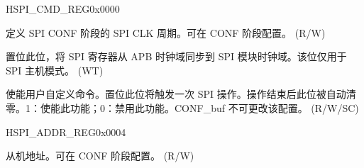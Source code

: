 \begin{register}{H}{SPI\_CMD\_REG}{0x0000}\label{regdesc:SPICMDREG}
%
%
%
%
%
\regnewline%
\begin{regdesc}\begin{reglist}
\label{fielddesc:SPICONFBITLEN}\item [SPI\_CONF\_BITLEN] 定义 SPI CONF 阶段的 SPI CLK 周期。可在 CONF 阶段配置。 (R/W)
\label{fielddesc:SPIUPDATE}\item [SPI\_UPDATE] 置位此位，将 SPI 寄存器从 APB 时钟域同步到 SPI 模块时钟域。该位仅用于 SPI 主机模式。 (WT)
\label{fielddesc:SPIUSR}\item [SPI\_USR] 使能用户自定义命令。置位此位将触发一次 SPI 操作。操作结束后此位被自动清零。1：使能此功能；0：禁用此功能。CONF\_buf 不可更改该配置。 (R/W/SC)
\end{reglist}\end{regdesc}
\end{register}


\begin{register}{H}{SPI\_ADDR\_REG}{0x0004}\label{regdesc:SPIADDRREG}
%
\regnewline%
\begin{regdesc}\begin{reglist}
\label{fielddesc:SPIUSRADDRVALUE}\item [SPI\_USR\_ADDR\_VALUE] 从机地址。可在 CONF 阶段配置。 (R/W)
\end{reglist}\end{regdesc}
\end{register}



